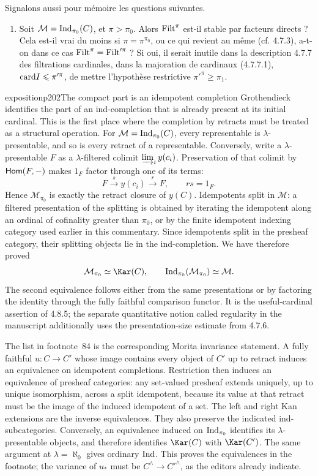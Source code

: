 Signalons aussi pour mémoire les questions suivantes.
\begin{enumerate}
\item[3)] Soit $\mathcal{M}=\operatorname{Ind}_{\pi_0}(C)$, et $\pi>\pi_0$. Alors $\mathrm{Filt}^\pi$ est-il stable par facteurs directs ? Cela est-il vrai du moins si $\pi=\pi^{\pi_0}$, ou ce qui revient au même (cf. 4.7.3), a-t-on dans ce cas $\mathrm{Filt}^\pi=\mathrm{Filt}'^{\pi}$ ? Si oui, il serait inutile dans la description 4.7.7 des filtrations cardinales, dans la majoration de cardinaux (4.7.7.1), $\mathrm{card} I\leqslant\pi'^{\pi}$, de mettre l'hypothèse restrictive $\pi'^{\pi}\geqslant\pi_1$.
\end{enumerate}

\begin{dcomment}{exposition}{p202}{The compact part is an idempotent completion}
Grothendieck identifies the part of an ind-completion that is already present at its initial cardinal. This is the first place where the completion by retracts must be treated as a structural operation. For $\mathcal M=\operatorname{Ind}_{\pi_0}(C)$, every representable is $\lambda$-presentable, and so is every retract of a representable. Conversely, write a $\lambda$-presentable $F$ as a $\lambda$-filtered colimit $\varinjlim_i y(c_i)$. Preservation of that colimit by $\mathsf{Hom}(F,-)$ makes $1_F$ factor through one of its terms:
\[
 F\xrightarrow{s}y(c_i)\xrightarrow{r}F,
 \qquad rs=1_F.
\]
Hence $\mathcal M_{\pi_0}$ is exactly the retract closure of $y(C)$. Idempotents split in $\mathcal M$: a filtered presentation of the splitting is obtained by iterating the idempotent along an ordinal of cofinality greater than $\pi_0$, or by the finite idempotent indexing category used earlier in this commentary. Since idempotents split in the presheaf category, their splitting objects lie in the ind-completion. We have therefore proved
\[
 \mathcal M_{\pi_0}\simeq\Kar(C),\qquad
 \Ind_{\pi_0}(\mathcal M_{\pi_0})\simeq\mathcal M.
\]
The second equivalence follows either from the same presentations or by factoring the identity through the fully faithful comparison functor. It is the useful-cardinal assertion of 4.8.5; the separate quantitative notion called regularity in the manuscript additionally uses the presentation-size estimate from 4.7.6.

The list in footnote~84 is the corresponding Morita invariance statement. A fully faithful $u:C\to C'$ whose image contains every object of $C'$ up to retract induces an equivalence on idempotent completions. Restriction then induces an equivalence of presheaf categories: any set-valued presheaf extends uniquely, up to unique isomorphism, across a split idempotent, because its value at that retract must be the image of the induced idempotent of a set. The left and right Kan extensions are the inverse equivalences. They also preserve the indicated ind-subcategories. Conversely, an equivalence induced on $\operatorname{Ind}_{\pi_0}$ identifies its $\lambda$-presentable objects, and therefore identifies $\Kar(C)$ with $\Kar(C')$. The same argument at $\lambda=\aleph_0$ gives ordinary $\operatorname{Ind}$. This proves the equivalences in the footnote; the variance of $u_*$ must be $C^\wedge\to C'^\wedge$, as the editors already indicate.


\end{dcomment}
